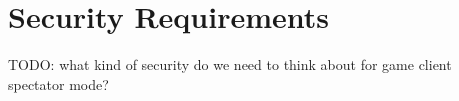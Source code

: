 \section{Security Requirements} \label{sec:security_requirements}


TODO: what kind of security do we need to think about for game client spectator mode?
